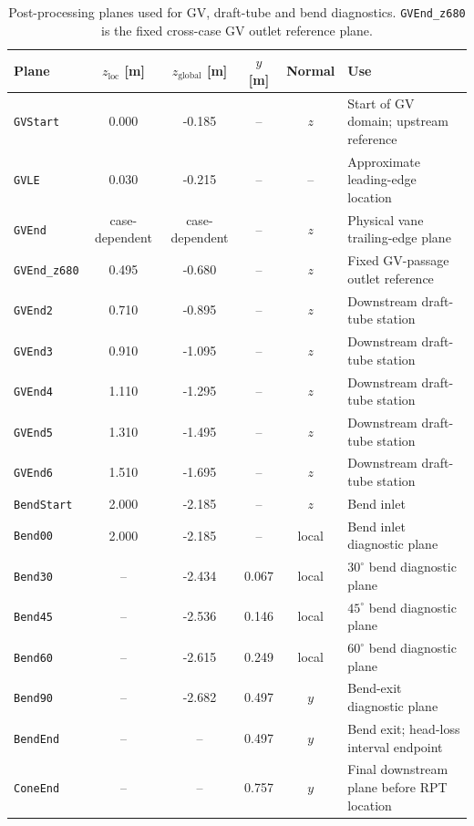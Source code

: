 \begin{table}[h!]
  \centering
  \caption[Analysis planes]{Post-processing planes used for GV, draft-tube and bend diagnostics. \texttt{GVEnd\_z680} is the fixed cross-case GV outlet reference plane.}
  \label{tab:planes}
  \small
  \begin{tabular}{l c c c c l}
    \toprule
    \textbf{Plane} &
    \textbf{\(z_{\mathrm{loc}}\) [m]} &
    \textbf{\(z_{\mathrm{global}}\) [m]} &
    \textbf{\(y\) [m]} &
    \textbf{Normal} &
    \textbf{Use} \\
    \midrule
    \texttt{GVStart}       & 0.000 & -0.185 & --    & \(z\) & Start of GV domain; upstream reference \\
    \texttt{GVLE}          & 0.030 & -0.215 & --    & --    & Approximate leading-edge location \\
    \texttt{GVEnd}         & case-dependent & case-dependent & -- & \(z\) & Physical vane trailing-edge plane \\
    \texttt{GVEnd\_z680}   & 0.495 & -0.680 & --    & \(z\) & Fixed GV-passage outlet reference \\
    \texttt{GVEnd2}        & 0.710 & -0.895 & --    & \(z\) & Downstream draft-tube station \\
    \texttt{GVEnd3}        & 0.910 & -1.095 & --    & \(z\) & Downstream draft-tube station \\
    \texttt{GVEnd4}        & 1.110 & -1.295 & --    & \(z\) & Downstream draft-tube station \\
    \texttt{GVEnd5}        & 1.310 & -1.495 & --    & \(z\) & Downstream draft-tube station \\
    \texttt{GVEnd6}        & 1.510 & -1.695 & --    & \(z\) & Downstream draft-tube station \\
    \texttt{BendStart}     & 2.000 & -2.185 & --    & \(z\) & Bend inlet \\
    \texttt{Bend00}        & 2.000 & -2.185 & --    & local & Bend inlet diagnostic plane \\
    \texttt{Bend30}        & --    & -2.434 & 0.067 & local & \(30^\circ\) bend diagnostic plane \\
    \texttt{Bend45}        & --    & -2.536 & 0.146 & local & \(45^\circ\) bend diagnostic plane \\
    \texttt{Bend60}        & --    & -2.615 & 0.249 & local & \(60^\circ\) bend diagnostic plane \\
    \texttt{Bend90}        & --    & -2.682 & 0.497 & \(y\) & Bend-exit diagnostic plane \\
    \texttt{BendEnd}       & --    & --     & 0.497 & \(y\) & Bend exit; head-loss interval endpoint \\
    \texttt{ConeEnd}       & --    & --     & 0.757 & \(y\) & Final downstream plane before RPT location \\
    \bottomrule
  \end{tabular}
\end{table}
 
